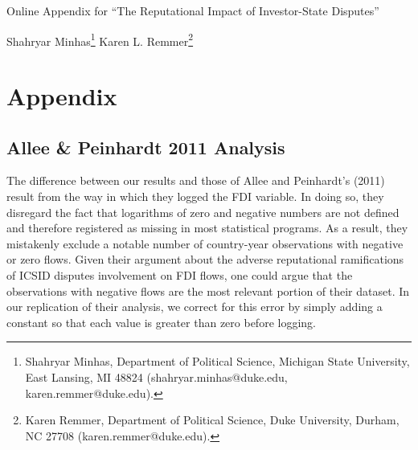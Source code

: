 \documentclass[12pt,onesided]{amsart}
\begin{document}
\thispagestyle{empty}

\begin{center}
{\sc \large Online Appendix for ``The Reputational Impact of Investor-State Disputes''}
\end{center}

\vspace{10mm}

\begin{center}
{\sc Shahryar Minhas}\footnote{Shahryar Minhas, Department of Political Science, Michigan State University, East Lansing, MI 48824 (shahryar.minhas@duke.edu, karen.remmer@duke.edu).}
{\sc Karen L. Remmer}\footnote{Karen Remmer, Department of Political Science, Duke University, Durham, NC 27708 (karen.remmer@duke.edu).}
\end{center}

\newpage

\setcounter{page}{1}
\doublespacing

\section*{Appendix}
\label{appendix}

\appendix
\setcounter{figure}{0} \renewcommand{\thefigure}{A.\arabic{figure}}
\setcounter{table}{0} \renewcommand{\thetable}{A.\arabic{table}}

\subsection*{Allee \& Peinhardt 2011 Analysis}

The difference between our results and those of Allee and Peinhardt's (2011) result from the way in which they logged the FDI variable. In doing so, they disregard the fact that logarithms of zero and negative numbers are not defined and therefore registered as missing in most statistical programs. As a result, they mistakenly exclude a notable number of country-year observations with negative or zero flows. Given their argument about the adverse reputational ramifications of ICSID disputes involvement on FDI flows, one could argue that the observations with negative flows are the most relevant portion of their dataset. In our replication of their analysis, we correct for this error by simply adding a constant so that each value is greater than zero before logging.
\end{document}
